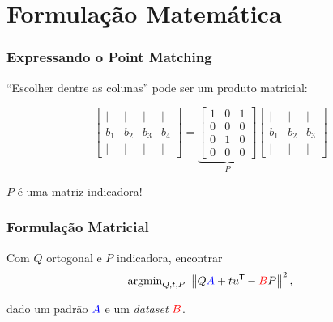 \section{Formulação Matemática}

\begin{frame}[fragile]
  \frametitle{Expressando o Point Matching}
  \begin{center}
    ``Escolher dentre as colunas'' pode ser um produto matricial:

    \[
      \begin{bmatrix}
        \vert & \vert & \vert & \vert \\
        b_1 & b_2 & b_3 & b_4 \\
        \vert & \vert & \vert & \vert
      \end{bmatrix}
      =
      \underbrace{\begin{bmatrix}
        1 & 0 & 1 \\
        0 & 0 & 0 \\
        0 & 1 & 0 \\
        0 & 0 & 0
      \end{bmatrix}}_{P}
      \begin{bmatrix}
        \vert & \vert & \vert \\
        b_1 & b_2 & b_3 \\
        \vert & \vert & \vert
      \end{bmatrix}
    \]

    $P$ é uma matriz indicadora!
  \end{center}
\end{frame}

\begin{frame}
  \frametitle{Formulação Matricial}
  \begin{center}
    Com $Q$ ortogonal e $P$ indicadora, encontrar
    \[\text{argmin}_{Q,t,P}\,\, \left\lVert Q\textcolor{blue}{A} + t u^{\mathsf{T}\mkern-1mu} - \textcolor{red}{B}P\right\rVert^2,\]

    dado um padrão $\textcolor{blue}{A}$ e um \textit{dataset} $\textcolor{red}{B}$.
  \end{center}
\end{frame}
